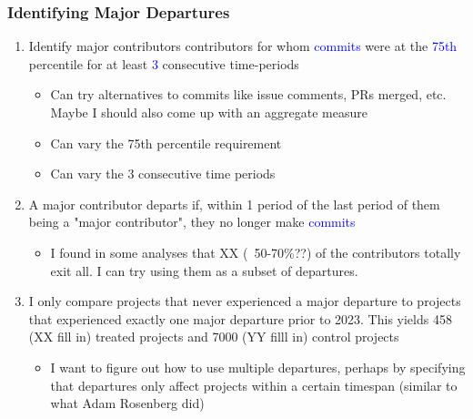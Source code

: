\documentclass[source/paper/main.tex]{subfiles}
\begin{document}
\subsubsection{Identifying Major Departures}
\begin{enumerate}
    \item Identify major contributors contributors for whom \textcolor{blue}{commits} were at the \textcolor{blue}{75th} percentile for at least \textcolor{blue}{3} consecutive time-periods
    \begin{itemize}
        \item Can try alternatives to commits like issue comments, PRs merged, etc. Maybe I should also come up with an aggregate measure
        \item Can vary the 75th percentile requirement
        \item Can vary the 3 consecutive time periods
    \end{itemize}
    \item A major contributor departs if, within 1 period of the last period of them being a "major contributor", they no longer make \textcolor{blue}{commits} 
    \begin{itemize}
        \item I found in some analyses that XX (~50-70\%??) of the contributors totally exit all. I can try using them as a subset of departures. 
    \end{itemize}
    \item I only compare projects that never experienced a major departure to projects that experienced exactly one major departure prior to 2023. This yields 458 (XX fill in) treated projects and 7000 (YY filll in) control projects
    \begin{itemize}
        \item I want to figure out how to use multiple departures, perhaps by specifying that departures only affect projects within a certain timespan (similar to what Adam Rosenberg did)
    \end{itemize}
\end{enumerate}
\end{document}
